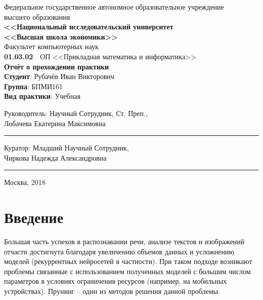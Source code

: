 \documentclass[12pt]{article}
\begin{document}
\begin{titlepage}
  \center
  Федеральное государственное автономное образовательное учреждение\\
  высшего образования \\[.2cm]
  \textbf{\large <<Национальный исследовательский университет\\
    <<Высшая школа экономики>>}\\[.2cm]
  Факультет компьютерных наук\\[.2cm]
  \textbf{01.03.02}\ \  ОП <<Прикладная математика и информатика>>\\[4cm]
  \textbf{\LARGE Отчёт о прохождении практики}\\[2cm]
  {\flushleft
  \textbf{Студент}: Рубачёв Иван Викторович \\
  \textbf{Группа}: БПМИ161 \\
  \textbf{Вид практики}: Учебная\\[5.7cm]}

  \begin{multicols}{3}
    {\flushleft \scriptsize Руководитель:\vfill\columnbreak}
    {\flushleft \scriptsize Научный Сотрудник, Ст. Преп., \\[0.1em]}
    {\flushleft \scriptsize Лобачева Екатерина Максимовна}
    {\vskip5mm\rule{5cm}{0.15mm}}
  \end{multicols}
  \begin{multicols}{3}
    {\flushleft \scriptsize Куратор:\vfill\columnbreak}
    {\flushleft \scriptsize Младший Научный Сотрудник, \\}
    {\flushleft \scriptsize Чиркова Надежда Александровна}
    {\vskip5mm\rule{5cm}{0.15mm}}
  \end{multicols}
  Москва, 2018
\end{titlepage}

{
\hypersetup{linkcolor=black}
\tableofcontents
}

\newpage

\section*{Введение}
%
Большая часть успехов в распознавании речи, анализе текстов и изображений отчасти достигнута благодаря
увеличению объемов данных и усложнению моделей (рекуррентных нейросетей в частности). При таком подходе
возникают проблемы связанные с использованием полученных моделей с большим числом параметров в условиях ограничения ресурсов
(например, на мобильных устройствах). Прунинг -- один из методов решения данной проблемы.
\end{document}
